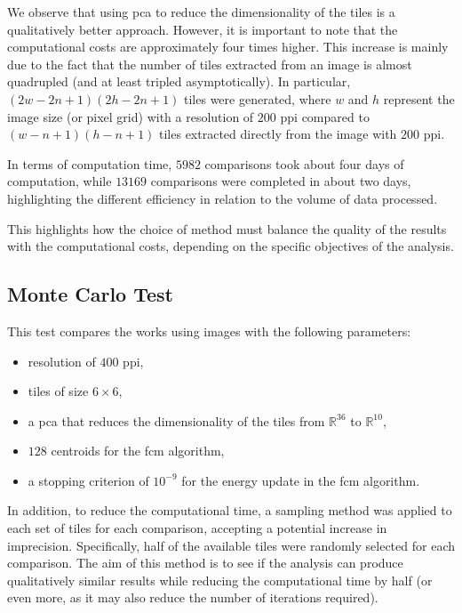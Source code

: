 \begin{toReview}
	We observe that using \gls{pca} to reduce the dimensionality of the tiles is a qualitatively better approach. However, it is important to note that the computational costs are approximately four times higher. This increase is mainly due to the fact that the number of tiles extracted from an image is almost quadrupled (and at least tripled asymptotically). In particular, $(2w-2n+1)(2h-2n+1)$ tiles were generated, where $w$ and $h$ represent the image size (or pixel grid) with a resolution of $200$ \gls{ppi} compared to $(w-n+1)(h-n+1)$ tiles extracted directly from the image with $200$ \gls{ppi}.

	\noindent In terms of computation time, $5982$ comparisons took about four days of computation, while $13169$ comparisons were completed in about two days, highlighting the different efficiency in relation to the volume of data processed.

	\noindent This highlights how the choice of method must balance the quality of the results with the computational costs, depending on the specific objectives of the analysis.

	\subsection{Monte Carlo Test}
	This test compares the works using images with the following parameters:

	\begin{itemize}
		\item resolution of $400$ \gls{ppi},
		\item tiles of size $6\times6$,
		\item a \gls{pca} that reduces the dimensionality of the tiles from $\mathbb{R}^{36}$ to $\mathbb{R}^{10}$,
		\item $128$ centroids for the \gls{fcm} algorithm,
		\item a stopping criterion of $10^{-9}$ for the energy update in the \gls{fcm} algorithm.
	\end{itemize}

	\noindent In addition, to reduce the computational time, a sampling method was applied to each set of tiles for each comparison, accepting a potential increase in imprecision. Specifically, half of the available tiles were randomly selected for each comparison. The aim of this method is to see if the analysis can produce qualitatively similar results while reducing the computational time by half (or even more, as it may also reduce the number of iterations required).

\end{toReview}
